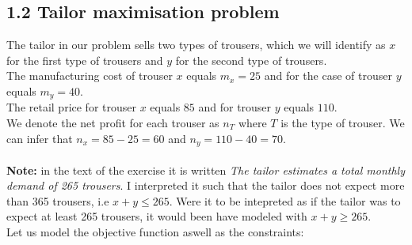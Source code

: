 \documentclass[unicode,11pt,a4paper,oneside,numbers=endperiod,openany]{scrartcl}
\begin{document}
\subsection*{1.2 Tailor maximisation problem}
The tailor in our problem sells two types of trousers, which we will identify as $x$ for the first type of trousers and $y$ for the second type of trousers.\\
The manufacturing cost of trouser $x$ equals $m_x = 25$ and for the case of trouser $y$ equals $m_y = 40$.\\
The retail price for trouser $x$ equals $85$  and for trouser $y$ equals $110$.\\
We denote the net profit for each trouser as $n_T$ where $T$ is the type of trouser. We can infer that $n_x=85-25=60$ and $n_y=110-40=70$.\\\\
\textbf{Note:} in the text of the exercise it is written \textit{The tailor estimates a total monthly demand of 265 trousers}. I interpreted it such that the tailor does not expect more than 365 trousers, i.e $x+y\leq265$. Were it to be intepreted as if the tailor was to expect at least 265 trousers, it would been have modeled with $x+y\geq265$.\\
Let us model the objective function aswell as the constraints:\\
\end{document}
